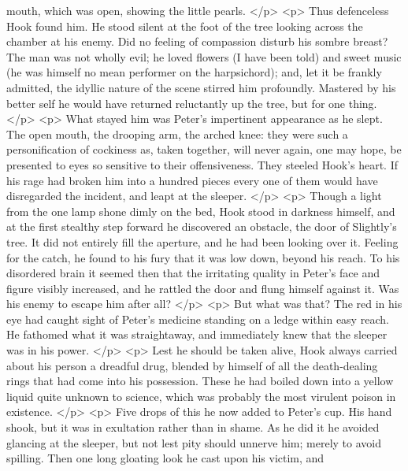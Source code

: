       mouth, which was open, showing the little pearls.
    </p>
    <p>
      Thus defenceless Hook found him. He stood silent at the foot of the tree
      looking across the chamber at his enemy. Did no feeling of compassion
      disturb his sombre breast? The man was not wholly evil; he loved flowers
      (I have been told) and sweet music (he was himself no mean performer on
      the harpsichord); and, let it be frankly admitted, the idyllic nature of
      the scene stirred him profoundly. Mastered by his better self he would
      have returned reluctantly up the tree, but for one thing.
    </p>
    <p>
      What stayed him was Peter's impertinent appearance as he slept. The open
      mouth, the drooping arm, the arched knee: they were such a personification
      of cockiness as, taken together, will never again, one may hope, be
      presented to eyes so sensitive to their offensiveness. They steeled Hook's
      heart. If his rage had broken him into a hundred pieces every one of them
      would have disregarded the incident, and leapt at the sleeper.
    </p>
    <p>
      Though a light from the one lamp shone dimly on the bed, Hook stood in
      darkness himself, and at the first stealthy step forward he discovered an
      obstacle, the door of Slightly's tree. It did not entirely fill the
      aperture, and he had been looking over it. Feeling for the catch, he found
      to his fury that it was low down, beyond his reach. To his disordered
      brain it seemed then that the irritating quality in Peter's face and
      figure visibly increased, and he rattled the door and flung himself
      against it. Was his enemy to escape him after all?
    </p>
    <p>
      But what was that? The red in his eye had caught sight of Peter's medicine
      standing on a ledge within easy reach. He fathomed what it was
      straightaway, and immediately knew that the sleeper was in his power.
    </p>
    <p>
      Lest he should be taken alive, Hook always carried about his person a
      dreadful drug, blended by himself of all the death-dealing rings that had
      come into his possession. These he had boiled down into a yellow liquid
      quite unknown to science, which was probably the most virulent poison in
      existence.
    </p>
    <p>
      Five drops of this he now added to Peter's cup. His hand shook, but it was
      in exultation rather than in shame. As he did it he avoided glancing at
      the sleeper, but not lest pity should unnerve him; merely to avoid
      spilling. Then one long gloating look he cast upon his victim, and
